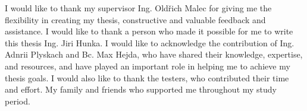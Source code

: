 I would like to thank my supervisor Ing. Oldřich Malec for giving me the flexibility in creating my thesis, constructive and valuable feedback and assistance. I would like to thank a person who made it possible for me to write this thesis Ing. Jiri Hunka.
I would like to acknowledge the contribution of Ing. Adnrii Plyskach and Bc. Max Hejda, who have shared their knowledge, expertise, and resources, and have played an important role in helping me to achieve my thesis goals.
I would also like to thank the testers, who contributed their time and effort. My family and friends who supported me throughout my study period.